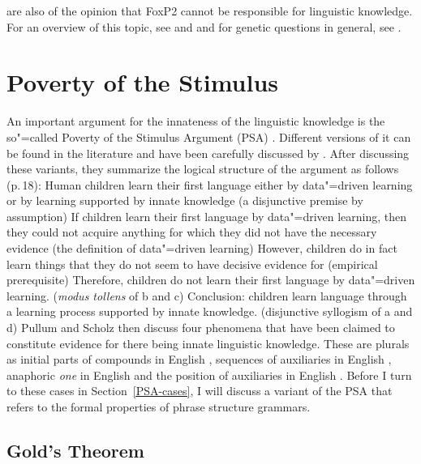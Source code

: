 \citet*[]{FHC2005a} are also of the opinion that FoxP2 cannot be responsible for linguistic knowledge. For an overview of this topic,
see  and  and for genetic questions in general, see . 

\section{Poverty of the Stimulus}
\label{Abschnitt-PSA}


An important argument for the innateness of the linguistic knowledge is the so"=called
Poverty of the Stimulus Argument (PSA) \citep[]{Chomsky80b-u}. Different versions of it can be found in the literature and have been carefully discussed
by \citet{PS2002a}. After discussing these variants, they summarize the logical structure of the
argument as follows (p.\,18):
\eal
\ex Human children learn their first language either by data"=driven learning or by learning supported by innate knowledge (a disjunctive premise by assumption)
\ex If children learn their first language by data"=driven learning, then they could not acquire anything for which they did not have the necessary evidence
(the definition of data"=driven learning)
\ex However, children do in fact learn things that they do not seem to have decisive evidence for (empirical prerequisite)
\ex Therefore, children do not learn their first language by data"=driven learning. (\emph{modus tollens} of b and c)
\ex Conclusion: children learn language through a learning process supported by innate knowledge. (disjunctive syllogism of a and d)
\zl
Pullum and Scholz then discuss four phenomena that have been claimed to constitute evidence for there being innate linguistic knowledge.
These are plurals as initial parts of compounds in English \citep{Gordon85a}, sequences of auxiliaries in English
\citep{Kimball73b-u}, anaphoric \emph{one} in English \citep{Baker78a-u} and the position of auxiliaries in English \citep[--33]{Chomsky71a-u}.
Before I turn to these cases in Section~\ref{PSA-cases}, I will discuss a variant of the PSA that refers to the formal properties of
phrase structure grammars.

\subsection{Gold's Theorem}
\label{Abschnitt-Golds-Theorem}

